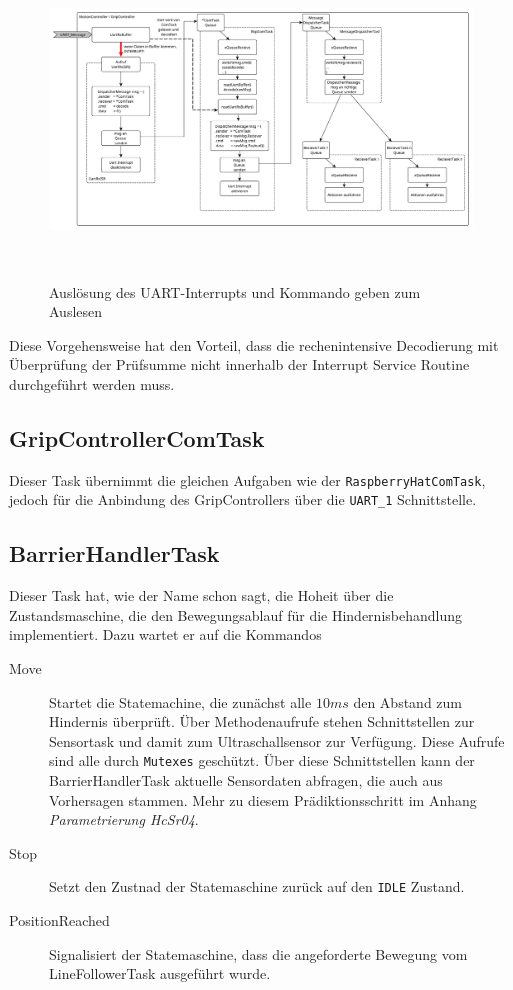 \documentclass[main.tex]{subfiles} %
\begin{document}
\begin{figure}[H]
    \centering
    \includegraphics[width=1\linewidth]{./fig_Firmware_MotionController/UartAuslesen.pdf}
    \caption{Auslösung des UART-Interrupts und Kommando geben zum Auslesen}~\label{fig:UartAuslesen}
\end{figure}

Diese Vorgehensweise hat den Vorteil, dass die rechenintensive Decodierung mit
Überprüfung der Prüfsumme nicht innerhalb der Interrupt Service Routine
durchgeführt werden muss.

\subsection*{GripControllerComTask}
Dieser Task übernimmt die gleichen Aufgaben wie der
\texttt{RaspberryHatComTask}, jedoch für die Anbindung des GripControllers über
die \texttt{UART\_1} Schnittstelle.

\subsection*{BarrierHandlerTask}
Dieser Task hat, wie der Name schon sagt, die Hoheit über die Zustandsmaschine,
die den Bewegungsablauf für die Hindernisbehandlung implementiert. Dazu wartet
er auf die Kommandos

\begin{description}
    \item[Move] Startet die Statemachine, die zunächst alle $10ms$ den Abstand zum
        Hindernis überprüft. Über Methodenaufrufe stehen Schnittstellen zur Sensortask
        und damit zum Ultraschallsensor zur Verfügung. Diese Aufrufe sind alle durch
        \texttt{Mutexes} geschützt. Über diese Schnittstellen kann der
        BarrierHandlerTask aktuelle Sensordaten abfragen, die auch aus Vorhersagen
        stammen. Mehr zu diesem Prädiktionsschritt im Anhang \textit{Parametrierung
            HcSr04}.

    \item[Stop] Setzt den Zustnad der Statemaschine zurück auf den \texttt{IDLE} Zustand.

    \item[PositionReached] Signalisiert der Statemaschine, dass die angeforderte Bewegung
        vom LineFollowerTask ausgeführt wurde.
\end{description}
\end{document}
